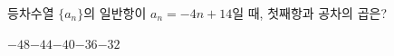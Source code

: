 등차수열 $\{a_n\}$의 일반항이 $a_n=-4n+14$일 때, 첫째항과 공차의 곱은?
\begin{choices32}{$-48$}{$-44$}{$-40$}{$-36$}{$-32$}\end{choices32}
